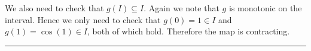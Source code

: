 \documentclass[10pt]{article}
\begin{document}
\begin{enumerate}
  We also need to check that $g(I) \subseteq I$. Again we note that
  $g$ is monotonic on the interval. Hence we only need to check that
  $g(0) = 1 \in I$ and $g(1) = \cos(1) \in I$, both of which
  hold. Therefore the map is contracting.
  \begin{center}
    \rule{0.9\textwidth}{.1pt}
  \end{center}
\end{enumerate}
\end{document}

